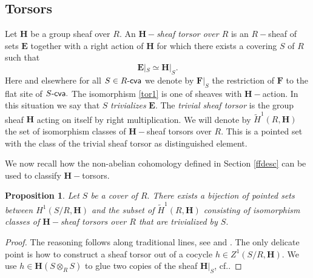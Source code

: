 \documentclass{article}
\newtheorem{prop}[thm]{Proposition}
\theoremstyle{definition}
\newtheorem{rem}[thm]{Remark}
\def\Isom{\ensuremath{\operatorname{Isom}}}
\def\BAut{\ensuremath{\operatorname{\mathbf{Aut}}}}
\def\BIsom{\ensuremath{\operatorname{\mathbf{Isom}}}}
\def\Sva{\ensuremath{S\text{-\textup{\textsf{va}}}}}
\def\Rcva{\ensuremath{R\text{-\textup{\textsf{cva}}}}}
\def\Scva{\ensuremath{S\text{-\textup{\textsf{cva}}}}}
\def\set{\ensuremath{\text{\textup{\textsf{set}}}}}
\def\BH{\ensuremath{\mathbf{H}}}
\def\BIsom{\ensuremath{\mathbf{I}\mathbf{s}\mathbf{o}\mathbf{m}}}
\def\tH{\ensuremath{\widetilde {H}}}
\begin{document}
\subsection{Torsors}\label{torsor}
Let $\BH$ be a group sheaf over $R.$ An $\BH-${\it sheaf torsor over $R$} is an $R-$sheaf of sets $\mathbf E$ together with a right action of $\BH$ for which there exists a covering $S$ of $R$ such that
\begin{equation}\label{tor1}
\mathbf E|_{S} \simeq \BH|_{S}.
\end{equation}
Here and elsewhere for all $S \in \Rcva$ we denote by $\mathbf F|_S$  the restriction of $\mathbf F$ to the flat site of $\Scva.$  The isomorphism \eqref{tor1} is one of sheaves with $\BH-$action. In this situation we say that $S$ {\it trivializes} $\mathbf E.$
 The  {\it trivial sheaf torsor} is the group sheaf $\BH$  acting on itself by right multiplication. We will denote by $\tH^1(R,\BH)$ the set of isomorphism classes of $\BH-$sheaf torsors over $R.$ This is a pointed set with the class of the trivial sheaf torsor as distinguished element.

We now recall how the non-abelian cohomology defined in Section \ref{ffdesc} can be used to classify $\BH-$torsors.
\begin{prop}\label{S/R} Let $S$ be a cover of $R.$ There exists a bijection  of pointed sets between $H^1(S/R, \BH)$ and the subset of $\tH^1(R, \BH)$ consisting of  isomorphism classes of $\BH-$sheaf torsors over $R$ that are trivialized by $S.$
\end{prop}
	\begin{proof} The reasoning follows along traditional lines,  see \@ \cite[\@III Prop.\@ 4.6]{Mln} and \cite[\@III \S4 Theo.\@ 6.4]{DeGa}. The only delicate point is how to construct a sheaf torsor out of a cocycle $h \in Z^1(S/R, \BH).$ We use $h \in \BH(S \otimes_R S)$ to glue two copies of the sheaf $\BH|_S$, cf.\@ \cite[Tag 04TR]{SP}.
\end{proof}


\end{document}
